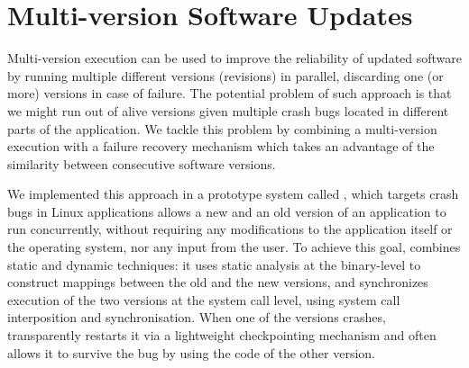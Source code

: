 \chapter{Multi-version Software Updates}
\label{chap:safe-updates}



Multi-version execution can be used to improve the reliability of updated
software by running multiple different versions (revisions) in parallel,
discarding one (or more) versions in case of failure. The potential problem
of such approach is that we might run out of alive versions given multiple
crash bugs located in different parts of the application. We tackle this
problem by combining a multi-version execution with a failure recovery
mechanism which takes an advantage of the similarity between consecutive
software versions.


We implemented this approach in a prototype system called \mx, which
targets crash bugs in Linux applications
\mx allows a new and an old version of an application to
run concurrently, without requiring any
modifications to the application itself or the operating system, nor any
input from the user. To achieve this goal, \mx combines static and
dynamic techniques: it uses static analysis at the binary-level to
construct mappings between the old and the new versions, and synchronizes
execution of the two versions at the system call level, using system call
interposition and synchronisation.  When one of the versions crashes, \mx
transparently restarts it via a lightweight checkpointing mechanism and often
allows it to survive the bug by using the code of the other version.

